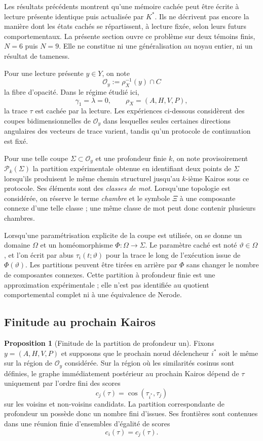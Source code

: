 \documentclass[11pt,a4paper]{article}
\theoremstyle{definition}
\newtheorem{propositionthm}[definition]{Proposition}
\theoremstyle{remark}
\begin{document}
Les résultats précédents montrent qu'une mémoire cachée peut être écrite à lecture présente identique puis actualisée par $K^*$. Ils ne décrivent pas encore la manière dont les états cachés se répartissent, à lecture fixée, selon leurs futurs comportementaux. La présente section ouvre ce problème sur deux témoins finis, $N=6$ puis $N=9$. Elle ne constitue ni une généralisation au noyau entier, ni un résultat de tameness.

Pour une lecture présente $y\in Y$, on note
\[
\mathcal O_y:=\rho_X^{-1}(y)\cap C
\]
la fibre d'opacité. Dans le régime étudié ici,
\[
\gamma_1=\lambda=0,
\qquad
\rho_X=(A,H,V,P),
\]
la trace $\tau$ est cachée par la lecture. Les expériences ci-dessous considèrent des coupes bidimensionnelles de $\mathcal O_y$ dans lesquelles seules certaines directions angulaires des vecteurs de trace varient, tandis qu'un protocole de continuation est fixé.

Pour une telle coupe $\Sigma\subset \mathcal O_y$ et une profondeur finie $k$, on note provisoirement $\mathcal P_k(\Sigma)$ la partition expérimentale obtenue en identifiant deux points de $\Sigma$ lorsqu'ils produisent le même chemin structurel jusqu'au $k$-ième Kairos sous ce protocole. Ses éléments sont des \emph{classes de mot}. Lorsqu'une topologie est considérée, on réserve le terme \emph{chambre} et le symbole $\Xi$ à une composante connexe d'une telle classe ; une même classe de mot peut donc contenir plusieurs chambres.

Lorsqu'une paramétrisation explicite de la coupe est utilisée, on se donne un domaine $\Omega$ et un homéomorphisme $\Phi:\Omega\to\Sigma$. Le paramètre caché est noté $\vartheta\in\Omega$, et l'on écrit par abus $\tau_i(t;\vartheta)$ pour la trace le long de l'exécution issue de $\Phi(\vartheta)$. Les partitions peuvent être tirées en arrière par $\Phi$ sans changer le nombre de composantes connexes. Cette partition à profondeur finie est une approximation expérimentale ; elle n'est pas identifiée au quotient comportemental complet ni à une équivalence de Nerode.

\subsection{Finitude au prochain Kairos}

\begin{propositionthm}[Finitude de la partition de profondeur un]
Fixons $y=(A,H,V,P)$ et supposons que le prochain nœud déclencheur $i^*$ soit le même sur la région de $\mathcal O_y$ considérée. Sur la région où les similarités cosinus sont définies, le graphe immédiatement postérieur au prochain Kairos dépend de $\tau$ uniquement par l'ordre fini des scores
\[
c_j(\tau)=\cos(\tau_{i^*},\tau_j)
\]
sur les voisins et non-voisins candidats. La partition correspondante de profondeur un possède donc un nombre fini d'issues. Ses frontières sont contenues dans une réunion finie d'ensembles d'égalité de scores
\[
c_i(\tau)=c_j(\tau).
\]
\end{propositionthm}
\end{document}
